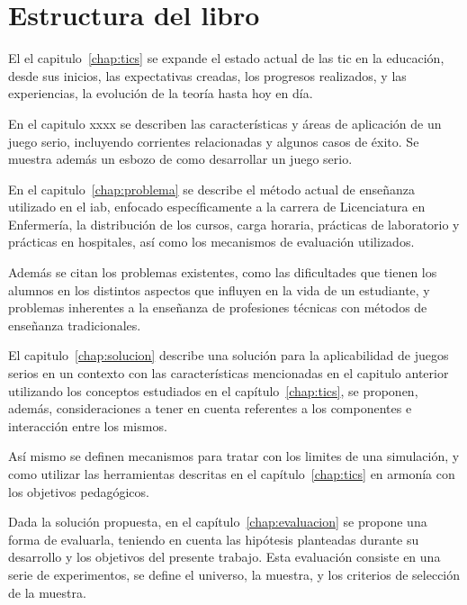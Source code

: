 \section{Estructura del libro}

    

El el capitulo~\ref{chap:tics} se expande el estado actual de las \Gls{tic} en
la educación, desde sus inicios, las expectativas creadas, los progresos
realizados, y las experiencias, la evolución de la teoría hasta hoy en día.

En el capitulo xxxx se describen las características y áreas de aplicación de un 
juego serio, incluyendo corrientes relacionadas y algunos casos de éxito. Se muestra 
además un esbozo de como desarrollar un juego serio.



En el capitulo~\ref{chap:problema} se describe el método actual de
enseñanza utilizado en el \Gls{iab}, enfocado específicamente a la carrera de
Licenciatura en Enfermería, la distribución de los cursos, carga horaria,
prácticas de laboratorio y prácticas en hospitales, así como los mecanismos de
evaluación utilizados.

Además se citan los problemas existentes, como las dificultades que tienen los
alumnos en los distintos aspectos que influyen en la vida de un estudiante, y
problemas inherentes a la enseñanza de profesiones técnicas con métodos de
enseñanza tradicionales.


El capitulo~\ref{chap:solucion} describe una solución  para la aplicabilidad de juegos serios 
en un contexto con las características mencionadas en el capitulo anterior utilizando los conceptos
estudiados en el capítulo~\ref{chap:tics}, se proponen, además, consideraciones
a tener en cuenta referentes a los componentes e interacción entre los mismos.

Así mismo se definen mecanismos para tratar con los limites de una simulación, y
como utilizar las herramientas descritas en el capítulo~\ref{chap:tics} en
armonía con los objetivos pedagógicos.


Dada la solución propuesta, en el capítulo~\ref{chap:evaluacion} se propone una
forma de evaluarla, teniendo en cuenta las hipótesis planteadas durante su desarrollo  
y los objetivos del presente trabajo. Esta evaluación consiste en una serie de experimentos, 
se define el universo, la muestra, y los criterios de selección de la muestra.

